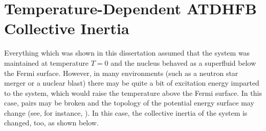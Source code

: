 \chapter{Temperature-Dependent ATDHFB Collective Inertia}\label{append:TD-ATDHFB}


Everything which was shown in this dissertation assumed that the system was maintained at temperature $T=0$ and the nucleus behaved as a superfluid below the Fermi surface. However, in many environments (such as a neutron star merger or a nuclear blast) there may be quite a bit of excitation energy imparted to the system, which would raise the temperature above the Fermi surface. In this case, pairs may be broken and the topology of the potential energy surface may change (see, for instance, \cite{Mcdonnell2014}). In this case, the collective inertia of the system is changed, too, as shown below.